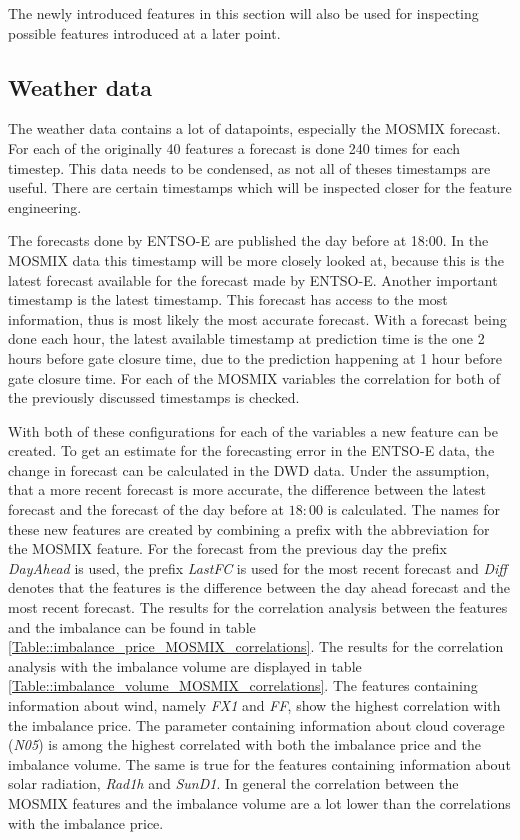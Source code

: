 \documentclass[class=scrbook, crop=false]{standalone}
\begin{document}
    The newly introduced features in this section will also be used for inspecting possible features introduced at a later point.
    
    \subsection{Weather data}
    \label{Section::Weather_data}
    The weather data contains a lot of datapoints, especially the MOSMIX forecast. 
    For each of the originally 40 features a forecast is done 240 times for each timestep. 
    This data needs to be condensed, as not all of theses timestamps are useful.
    There are certain timestamps which will be inspected closer for the feature engineering.
    
    The forecasts done by ENTSO-E are published the day before at 18:00. 
    In the MOSMIX data this timestamp will be more closely looked at, because this is the latest forecast available for the forecast made by ENTSO-E.
    Another important timestamp is the latest timestamp. This forecast has access to the most information, thus is most likely the most accurate forecast.
    With a forecast being done each hour, the latest available timestamp at prediction time is the one 2 hours before gate closure time, due to the prediction happening at 1 hour before gate closure time.
    For each of the MOSMIX variables the correlation for both of the previously discussed timestamps is checked.
    
    With both of these configurations for each of the variables a new feature can be created. 
    To get an estimate for the forecasting error in the ENTSO-E data, the change in forecast can be calculated in the DWD data.
    Under the assumption, that a more recent forecast is more accurate, the difference between the latest forecast and the forecast of the day before at $18:00$ is calculated.
    The names for these new features are created by combining a prefix with the abbreviation for the MOSMIX feature.
    For the forecast from the previous day the prefix \textit{DayAhead} is used, the prefix \textit{LastFC} is used for the most recent forecast and \textit{Diff} denotes that the features is the difference between the day ahead forecast and the most recent forecast.
    The results for the correlation analysis between the features and the imbalance can be found in table \ref{Table::imbalance_price_MOSMIX_correlations}. The results for the correlation analysis with the imbalance volume are displayed in table \ref{Table::imbalance_volume_MOSMIX_correlations}.
    The features containing information about wind, namely \textit{FX1} and \textit{FF}, show the highest correlation with the imbalance price. The parameter containing information about cloud coverage (\textit{N05}) is among the highest correlated with both the imbalance price and the imbalance volume. The same is true for the features containing information about solar radiation, \textit{Rad1h} and \textit{SunD1}. In general the correlation between the MOSMIX features and the imbalance volume are a lot lower than the correlations with the imbalance price.
    
\end{document}
